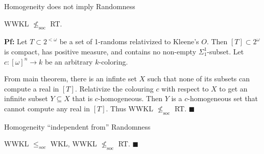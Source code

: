 \begin{frame}{Homogeneity does not imply Randomness}
  \begin{theorem}
    WWKL $\nleq_{\text{soc}}$ RT.
  \end{theorem}

  \vspace{1em}
  \textbf{Pf:} Let $T\subset2^{<\omega}$ be a set of 1-randoms relativized
  to Kleene's $O$. Then $[T]\subset 2^\omega$ is compact, has positive
  measure, and contains no non-empty $\Sigma_1^1$-subset. Let
  $c:[\omega]^n\rightarrow k$ be an arbitrary $k$-coloring.
  
  \vspace{1em}
  From main theorem, there is an infinte set $X$ such that none of its
  subsets can compute a real in $[T]$. Relativize the colouring $c$ with
  respect to $X$ to get an infinite subset $Y\subseteq X$ that is
  $c$-homogeneous. Then $Y$ is a $c$-homogeneous set that cannot compute
  any real in $[T]$. Thus WWKL $\nleq_{\text{soc}}$ RT.
  $\blacksquare$
\end{frame}

\begin{frame}{Homogeneity ``independent from'' Randomness}
  \begin{coro}
    WWKL $\leq_{soc}$ WKL, WWKL $\nleq_{\text{soc}}$ RT. $\blacksquare$
  \end{coro}

  \vspace{2em}
  \begin{center}
  \end{center}
\end{frame}
